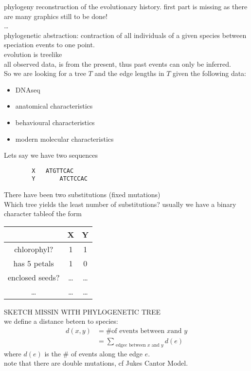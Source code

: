 \documentclass[a4paper]{article}
\theoremstyle{definition}
\theoremstyle{remark}
\begin{document}
phylogeny 
reconstruction of the evolutionary history.
first part is missing as there are many graphics still to be done!\\
\dots\\
phylogenetic abstraction: contraction of all individuals of a given species between speciation events to one point.\\ 
evolution is treelike\\
all observed data, is from the present, thus past events can only be inferred.\\
So we are looking for a tree $T$ and the edge lengths in $T$ given the following data:
\begin{itemize}
	\item DNAseq
	\item anatomical  characteristics
	\item behavioural characteristics
	\item modern molecular characteristics
\end{itemize}
Lets say we have two sequences 
\begin{verbatim}
		X   ATGTTCAC
		Y		ATCTCCAC
\end{verbatim}
There have been two substitutions (fixed mutations)\\ 
Which tree yields the least number of substitutions?
usually we have a binary character tableof the form
\begin{center}
	\begin{tabular}{ c|c|c|}
		& X & Y \\
		\hline 
		chlorophyl? & 1 & 1\\
		has 5 petals & 1&0\\
		enclosed seeds? &\dots&\dots\\
		\dots&\dots&\dots
	\end{tabular}
\end{center}
SKETCH MISSIN WITH PHYLOGENETIC TREE\\
we define a distance beteen to species:
\begin{equation*}
	\begin{split}
	d(x,y)&= \textrm{\# of events between } x \textrm{and  } y\\
	&=\sum_{\textrm{ edge} e \textrm{ between }x \textrm{ and  } y}	d(e)
	\end{split}
\end{equation*}
where $d(e)$ is the \# of events along the edge $e$.\\
note that there are double mutations, cf Jukes Cantor Model.\\ 
\end{document}
